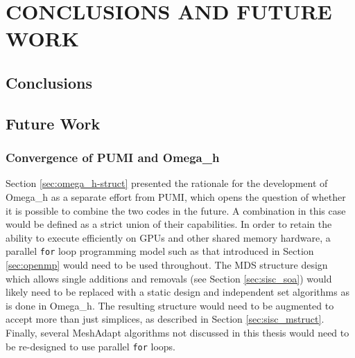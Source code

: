 
\chapter{CONCLUSIONS AND FUTURE WORK}

\section{Conclusions}

\section{Future Work}

\subsection{Convergence of PUMI and Omega\_h}
\label{sec:converge}

Section \ref{sec:omega_h-struct} presented the rationale
for the development of Omega\_h as a separate effort from PUMI,
which opens the question of whether it is possible
to combine the two codes in the future.
A combination in this case would be defined as a strict
union of their capabilities.
In order to retain the ability to execute efficiently
on GPUs and other shared memory hardware, a parallel
\texttt{for} loop programming model such as that introduced
in Section \ref{sec:openmp} would need to be used throughout.
The MDS structure design which allows single additions
and removals (see Section \ref{sec:sisc_soa}) would likely
need to be replaced with a static design and independent
set algorithms as is done in Omega\_h.
The resulting structure would need to be augmented to
accept more than just simplices, as described in Section \ref{sec:sisc_mstruct}.
Finally, several MeshAdapt algorithms not discussed
in this thesis would need to be re-designed to use parallel
\texttt{for} loops.
